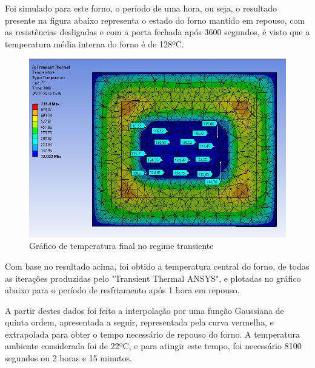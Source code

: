 Foi simulado para este forno, o período de uma hora, ou seja, o resultado presente na figura
abaixo representa o estado do forno mantido em repouso, com as resistências desligadas e com a
porta fechada após 3600 segundos, é visto que a temperatura média interna do forno é de 128ºC.
\begin{figure}[ht]
	\centering
	\label{ansys13}
	\includegraphics[keepaspectratio=true,scale=0.8]{figuras/ansys13.jpg}
    \caption{Gráfico de temperatura final no regime transiente}
\end{figure}

Com base no resultado acima, foi obtido a temperatura central do forno, de todas as
iterações produzidas pelo "Transient Thermal ANSYS", e plotadas no gráfico abaixo para o período
de resfriamento após 1 hora em repouso.

A partir destes dados foi feito a interpolação por uma função Gaussiana de quinta ordem,
apresentada a seguir, representada pela curva vermelha, e extrapolada para obter o tempo
necessário de repouso do forno. A temperatura ambiente considerada foi de 22ºC, e para atingir
este tempo, foi necessário 8100 segundos ou 2 horas e 15 minutos.

